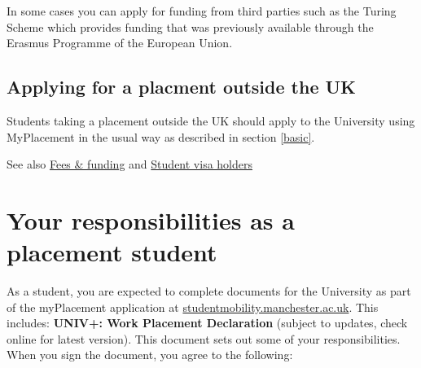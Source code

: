 \documentclass[
]{book}
\begin{document}
In some cases you can apply for funding from third parties such as the Turing Scheme which provides funding that was previously available through the Erasmus Programme of the European Union. \citep{turing}

\section{Applying for a placment outside the UK}\label{applying-for-a-placment-outside-the-uk}

Students taking a placement outside the UK should apply to the University using MyPlacement in the usual way as described in section \ref{basic}.

See also \href{https://www.manchester.ac.uk/study/undergraduate/fees-and-funding/}{Fees \& funding} and \href{https://www.studentsupport.manchester.ac.uk/immigration-and-visas/}{Student visa holders}

\chapter{Your responsibilities as a placement student}\label{you}

As a student, you are expected to complete documents for the University as part of the myPlacement application at \href{https://studentmobility.manchester.ac.uk/}{studentmobility.manchester.ac.uk}. This includes: \textbf{UNIV+: Work Placement Declaration }(subject to updates, check online for latest version). This document sets out some of your responsibilities. When you sign the document, you agree to the following:
\end{document}
